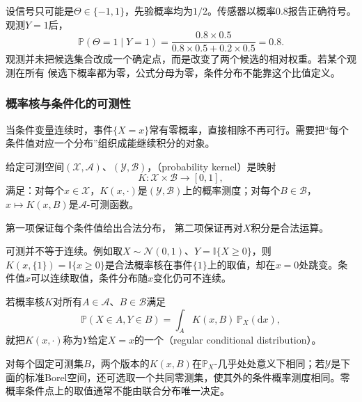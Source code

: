 \begin{example}[有限候选经过带噪观测更新]
\label{ex:probability-finite-candidate-bayes}
设信号只可能是\(\Theta\in\{-1,1\}\)，先验概率均为\(1/2\)。传感器以概率\(0.8\)报告正确符号。观测\(Y=1\)后，
\[ \mathbb{P}(\Theta=1\mid Y=1)
  =\frac{0.8\times0.5}{0.8\times0.5+0.2\times0.5}=0.8. \]
观测并未把候选集合改成一个确定点，而是改变了两个候选的相对权重。若某个观测在所有
候选下概率都为零，公式分母为零，条件分布不能靠这个比值定义。
\end{example}

\subsubsection{概率核与条件化的可测性}

当条件变量连续时，事件\(\{X=x\}\)常有零概率，直接相除不再可行。需要把“每个条件值对应一个分布”组织成能继续积分的对象。
\begin{definition}[概率核]
  \label{def:probability-kernel}
  给定可测空间\((\mathcal X,\mathcal A)\)、\((\mathcal Y,\mathcal B)\)，（probability kernel）是映射
  \[ K:\mathcal X\times\mathcal B\to[0,1], \]
  满足：对每个\(x\in\mathcal X\)，\(K(x,\cdot)\)是\((\mathcal Y,\mathcal B)\)上的概率测度；对每个\(B\in\mathcal B\)，\(x\mapsto K(x,B)\)是\(\mathcal A\)-可测函数。
\end{definition}
第一项保证每个条件值给出合法分布，
第二项保证再对\(X\)积分是合法运算。

可测并不等于连续。例如取\(X\sim\mathcal N(0,1)\)、\(Y=\mathbb I\{X\geq0\}\)，则\(K(x,\{1\})=\mathbb I\{x\geq0\}\)是合法概率核在事件\(\{1\}\)上的取值，却在\(x=0\)处跳变。条件值\(x\)可以连续取值，条件分布随\(x\)变化仍可不连续。

\begin{definition}[正则条件分布]
  \label{def:probability-regular-conditional-distribution}
若概率核\(K\)对所有\(A\in\mathcal A\)、\(B\in\mathcal B\)满足
\begin{equation}
  \mathbb{P}(X\in A,Y\in B)
  =
  \int_A K(x,B)\,\mathbb{P}_X(\mathrm{d}x),
  \label{eq:probability-regular-conditional-kernel}
\end{equation}
就把\(K(x,\cdot)\)称为\(Y\)给定\(X=x\)的一个（regular conditional distribution）。
\end{definition}
对每个固定可测集\(B\)，两个版本的\(K(x,B)\)在\(\mathbb P_X\)-几乎处处意义下相同；若\(\mathcal Y\)是下面的标准Borel空间，还可选取一个共同零测集，使其外的条件概率测度相同。零概率条件点上的取值通常不能由联合分布唯一决定。


